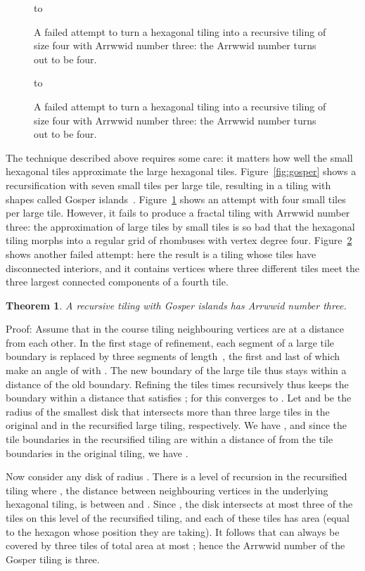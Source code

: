 \documentclass[11pt,a4paper]{article}
\newtheorem{theorem}{Theorem}
\newenvironment{proof}{Proof:}{\qed}
\def\squareforqed{\hbox{\rlap{}}}
\def\qed{\ifmmode\squareforqed\else{\unskip\nobreak\hfil
\penalty50\hskip1em\null\nobreak\hfil\squareforqed
\parfillskip=0pt\finalhyphendemerits=0\endgraf}\fi}
\begin{document}
\begin{figure}
\centering
\hbox to 
\caption{A failed attempt to turn a hexagonal tiling into a recursive tiling of size four with Arrwwid number three: the Arrwwid number turns out to be four.}
\label{fig:rhombus}
\end{figure}

\begin{figure}
\centering
\hbox to 
\caption{A failed attempt to turn a hexagonal tiling into a recursive tiling of size four with Arrwwid number three: the Arrwwid number turns out to be four.}
\label{fig:disconnected}
\end{figure}

The technique described above requires some care: it matters how well the small hexagonal tiles approximate the large hexagonal tiles. Figure~\ref{fig:gosper} shows a recursification with seven small tiles per large tile, resulting in a tiling with shapes called Gosper islands~\cite{Gardner1976}. Figure~\ref{fig:rhombus} shows an attempt with four small tiles per large tile. However, it fails to produce a fractal tiling with Arrwwid number three: the approximation of large tiles by small tiles is so bad that the hexagonal tiling morphs into a regular grid of rhombuses with vertex degree four. Figure~\ref{fig:disconnected} shows another failed attempt: here the result is a tiling whose tiles have disconnected interiors, and it contains vertices where three different tiles meet the three largest connected components of a fourth tile.

\begin{theorem}\label{th:gosper}
A recursive tiling with Gosper islands has Arrwwid number three.
\end{theorem}
\begin{proof}
Assume that in the course tiling neighbouring vertices are at a distance  from each other. In the first stage of refinement, each segment  of a large tile boundary is replaced by three segments of length~, the first and last of which make an angle of  with . The new boundary of the large tile thus stays within a distance  of the old boundary. Refining the tiles  times recursively thus keeps the boundary within a distance  that satisfies ; for  this converges to . Let  and  be the radius of the smallest disk that intersects more than three large tiles in the original and in the recursified large tiling, respectively. We have , and since the tile boundaries in the recursified tiling are within a distance of  from the tile boundaries in the original tiling, we have .

Now consider any disk  of radius . There is a level of recursion in the recursified tiling where , the distance between neighbouring vertices in the underlying hexagonal tiling, is between  and . Since , the disk  intersects at most three of the tiles on this level of the recursified tiling, and each of these tiles has area  (equal to the hexagon whose position they are taking). It follows that  can always be covered by three tiles of total area at most ; hence the Arrwwid number of the Gosper tiling is three.
\end{proof}
\end{document}
